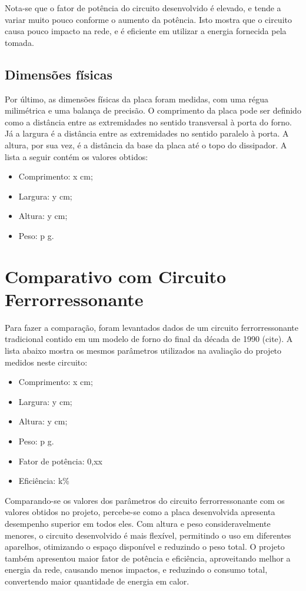 Nota-se que o fator de potência do circuito desenvolvido é elevado, e tende a variar muito pouco conforme o aumento da potência. Isto mostra que o circuito causa pouco impacto na rede, e é eficiente em utilizar a energia fornecida pela tomada.


\subsection{Dimensões físicas}
Por último, as dimensões físicas da placa foram medidas, com uma régua milimétrica e uma balança de precisão. O comprimento da placa pode ser definido como a distância entre as extremidades no sentido transversal à porta do forno. Já a largura é a distância entre as extremidades no sentido paralelo à porta. A altura, por sua vez, é a distância da base da placa até o topo do dissipador. A lista a seguir contém os valores obtidos:

\bigskip
\begin{itemize}
    \item Comprimento: x cm;
    \item Largura: y cm;
    \item Altura: y cm;
    \item Peso: p g.
\end{itemize}
\bigskip

\section{Comparativo com Circuito Ferrorressonante}

Para fazer a comparação, foram levantados dados de um circuito ferrorressonante tradicional contido em um modelo de forno do final da década de 1990 (cite).  A lista abaixo mostra os mesmos parâmetros utilizados na avaliação do projeto medidos neste circuito: 

\bigskip
\begin{itemize}
    \item Comprimento: x cm;
    \item Largura: y cm;
    \item Altura: y cm;
    \item Peso: p g.
    \item Fator de potência: 0,xx
    \item Eficiência: k\%
\end{itemize}
\bigskip

 Comparando-se os valores dos parâmetros do circuito ferrorressonante com os valores obtidos no projeto, percebe-se como a placa desenvolvida apresenta desempenho superior em todos eles. Com altura e peso consideravelmente menores, o circuito desenvolvido é mais flexível, permitindo o uso em diferentes aparelhos, otimizando o espaço disponível e reduzindo o peso total. O projeto também apresentou maior fator de potência e eficiência, aproveitando melhor a energia da rede, causando menos impactos, e reduzindo o consumo total, convertendo maior quantidade de energia em calor.
